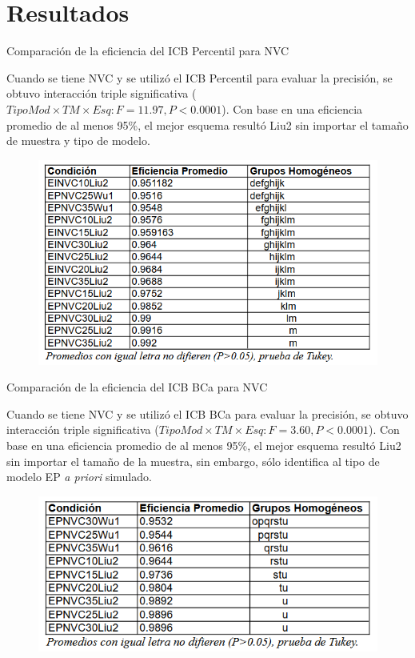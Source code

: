 \documentclass[serif, aspectratio=169]{beamer}
\begin{document}
\section{Resultados}
\begin{frame}{Comparación de la eficiencia del ICB Percentil para NVC}
		
		Cuando se tiene NVC y se utilizó el ICB Percentil para evaluar la precisión, se obtuvo interacción triple significativa ($TipoMod \times TM \times Esq: F=11.97, P<0.0001$). Con base en una eficiencia promedio de al menos 95\%, el mejor esquema
		resultó Liu2 sin importar el tamaño de muestra y tipo de modelo.
		\begin{figure} 
			\centering 
			\includegraphics[width=0.60\linewidth]{recurso/CompEfic_PromICB_Perc_NVC.png} 
			\label{fig:CompEfic_PromICB_Perc_NVC}
		\end{figure}
	
\end{frame}



\begin{frame}{Comparación de la eficiencia del ICB BCa para NVC}
	
	Cuando se tiene NVC y se utilizó el ICB BCa para evaluar la precisión, se obtuvo interacción triple significativa ($TipoMod \times TM \times Esq: F=3.60, P<0.0001$).
	Con base en una eficiencia promedio de al menos 95\%, el mejor esquema resultó Liu2 sin importar el tamaño de la muestra, sin embargo, sólo identifica al tipo de modelo EP \textit{a priori} simulado.
	
	\begin{figure}[ht] 
		\centering 
		\includegraphics[width=0.72\linewidth]{recurso/CompEfic_PromICB_BCa_NVC.png} 
		\label{fig:CompEfic_PromICB_BCa_NVC}
	\end{figure}
	
\end{frame}
\end{document}
